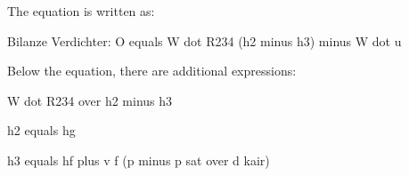 The equation is written as:

Bilanze Verdichter: O equals W dot R234 (h2 minus h3) minus W dot u

Below the equation, there are additional expressions:

W dot R234 over h2 minus h3

h2 equals hg

h3 equals hf plus v f (p minus p sat over d kair)